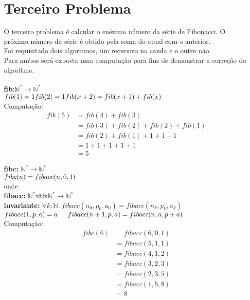 \documentclass{article}
\begin{document}
\section{Terceiro Problema}
O terceiro problema é calcular o enézimo número da série de Fibonacci. O próximo número da série é obtido pela soma do atual com o anterior.\\
Foi requisitado dois algoritmos, um recursivo na cauda e o outro não.\\
Para ambos será exposta uma computação para fins de demonstrar a correção do algoritmo.\\
\\
\textbf{fib:}$\mathbb{N}^* \rightarrow \mathbb{N}^*$\\
$fib(1) = 1\\
fib(2) = 1\\
fib(x+2) = fib(x+1) + fib(x)\\$
\\
Computação:
\begin{align*}
fib(5) &= fib(4) + fib(3)\\
&= fib(3) + fib(2) + fib(2) + fib(1)\\
&= fib(2) + fib(1) + 1 + 1 + 1\\
&= 1 + 1 + 1 + 1 + 1\\
&= 5
\end{align*}

\noindent\textbf{fibc:} $\mathbb{N}^* \rightarrow \mathbb{N}^*$\\
$fibc(n) = fibacc(n, 0, 1)\\$
\\
onde\\
\indent \textbf{fibacc:} $\mathbb{N}^*$x$\mathbb{N}$x$\mathbb{N}^* \rightarrow \mathbb{N}^*$\\
\indent \textbf{invariante:} $\forall k:\mathbb{N}.\: fibacc(n_0, p_0, a_0) = fibacc(n_k, p_k, a_k)$\\
\indent $fibacc(1, p, a) = a\\
\indent fibacc(n+1, p, a) = fibacc(n, a, p+a)\\$
\\
Computação:
\begin{align*}
fibc(6) &= fibacc(6, 0, 1)\\
&= fibacc(5, 1, 1)\\
&= fibacc(4, 1, 2)\\
&= fibacc(3, 2, 3)\\
&= fibacc(2, 3, 5)\\
&= fibacc(1, 5, 8)\\
&= 8
\end{align*}
\end{document}
